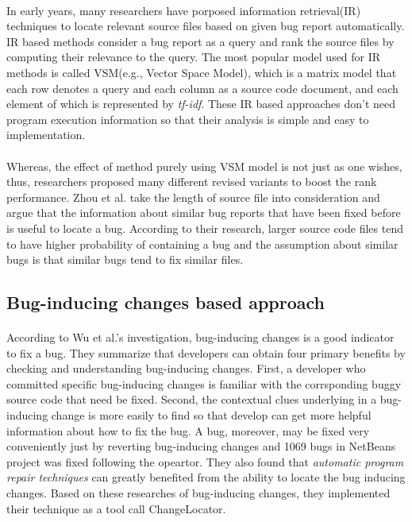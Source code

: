 \documentclass[a4paper]{article}
\begin{document}
\paragraph{}
In early years, many researchers have porposed information retrieval(IR) techniques to locate relevant source files based on given bug report automatically\cite{BugLocator}. IR based methods consider a bug report as a query and rank the source files by computing their relevance to the query. The most popular model used for IR methods is called VSM(e.g., Vector Space Model), which is a matrix model that each row denotes a query and each column as a source code document, and each element of which is represented by \emph{tf-idf}. These IR based approaches don't need program execution information so that their analysis is simple and easy to implementation.
\vspace{-1em}

\paragraph{}
Whereas, the effect of method purely using VSM model is not just as one wishes, thus, researchers proposed many different revised variants to boost the rank performance. Zhou et al.\cite{BugLocator} take the length of source file into consideration and argue that the information about similar bug reports that have been fixed before is useful to locate a bug. According to their research, larger source code files tend to have higher probability of containing a bug and the assumption about similar bugs is that similar bugs tend to fix similar files. 
\vspace{-1em}

\subsection{Bug-inducing changes based approach}
\paragraph{}
According to Wu et al.'s\cite{ChangeLocator} investigation, bug-inducing changes is a good indicator to fix a bug. They summarize that developers can obtain four primary benefits by checking and understanding bug-inducing changes. First, a developer who committed specific bug-inducing changes is familiar with the corrsponding buggy source code that need be fixed. Second, the contextual clues underlying in a bug-inducing change is more easily to find so that develop can get more helpful information about how to fix the bug. A bug, moreover, may be fixed very conveniently just by reverting bug-inducing changes and 1069 bugs in NetBeans project was fixed following the opeartor. They also found that \emph{automatic program repair techniques} can greatly benefited from the ability to locate the bug inducing changes. Based on these researches of bug-inducing changes, they implemented their technique as a tool call ChangeLocator.
\vspace{-1em}
\end{document}
